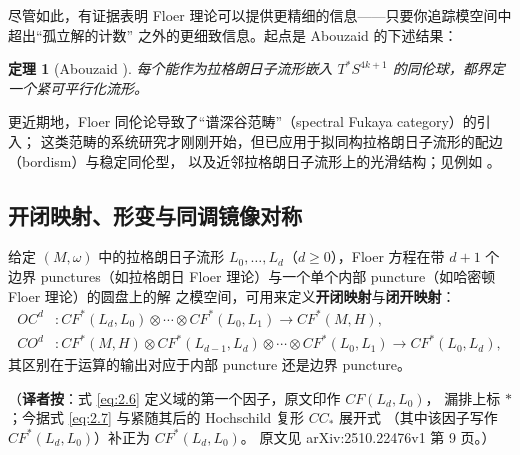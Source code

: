 \documentclass[UTF8,a4paper,11pt,fontset=windows]{ctexart}
\theoremstyle{cnthm}
\newtheorem{thm}{定理}[section]
\numberwithin{equation}{section}
\newcommand{\CF}{CF}                  %
\begin{document}

尽管如此，有证据表明 Floer 理论可以提供更精细的信息——只要你追踪模空间中超出“孤立解的计数”
之外的更细致信息。起点是 Abouzaid 的下述结果：

\begin{thm}[Abouzaid \cite{r3}]\label{thm:2.6}
每个能作为拉格朗日子流形嵌入 $T^{*}S^{4k+1}$ 的同伦球，都界定一个紧可平行化流形。
\end{thm}

更近期地，Floer 同伦论导致了“谱深谷范畴”（spectral Fukaya category）的引入；
这类范畴的系统研究才刚刚开始，但已应用于拟同构拉格朗日子流形的配边（bordism）与稳定同伦型，
以及近邻拉格朗日子流形上的光滑结构；见例如 \cite{r67,r86,r87}。

\subsection{开闭映射、形变与同调镜像对称}\label{sec:2.4}

给定 $(M,\omega)$ 中的拉格朗日子流形 $L_0,\dots,L_d$（$d\ge0$），Floer 方程在带 $d+1$ 个边界
punctures（如拉格朗日 Floer 理论）与一个单个内部 puncture（如哈密顿 Floer 理论）的圆盘上的解
之模空间，可用来定义\textbf{开闭映射}与\textbf{闭开映射}：
\begin{align}
OC^{d}&:\CF^{*}(L_d,L_0)\otimes\cdots\otimes\CF^{*}(L_0,L_1)\longrightarrow\CF^{*}(M,H),\label{eq:2.6}\\
CO^{d}&:\CF^{*}(M,H)\otimes\CF^{*}(L_{d-1},L_d)\otimes\cdots\otimes\CF^{*}(L_0,L_1)
\longrightarrow\CF^{*}(L_0,L_d),\label{eq:2.7}
\end{align}
其区别在于运算的输出对应于内部 puncture 还是边界 puncture。

\smallskip
\noindent（\textbf{译者按}：式 \eqref{eq:2.6} 定义域的第一个因子，原文印作 $CF(L_d,L_0)$，
漏排上标 $*$；今据式 \eqref{eq:2.7} 与紧随其后的 Hochschild 复形 $CC_*$ 展开式
（其中该因子写作 $CF^{*}(L_d,L_0)$）补正为 $CF^{*}(L_d,L_0)$。
原文见 arXiv:2510.22476v1 第 9 页。）
\end{document}
